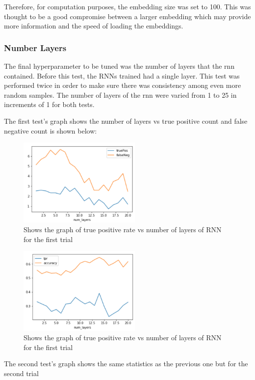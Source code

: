 \documentclass[twoside,twocolumn]{article}
\begin{document}
Therefore, for computation purposes, the embedding size was set to 100. This was thought to be
a good compromise between a larger embedding which may provide more information and the speed 
of loading the embeddings.

\subsubsection{Number Layers}

The final hyperparameter to be tuned was the number of layers that the rnn contained. Before this
test, the RNNs trained had a single layer. This test was performed twice in order to make sure there
 was consistency among even more random samples. The number of layers of the rnn were varied
 from 1 to 25 in increments of 1 for both tests.

 The first test's graph shows the number of layers vs true positive count and false negative count is shown below:

\begin{figure}[H]
\includegraphics[width=6cm]{rnn_numberLayers_test1}
\caption{Shows the graph of true positive rate vs number of layers of RNN for the first trial}
\centering
\end{figure}

\begin{figure}[H]
\includegraphics[width=6cm]{rnn_numberLayers_test1-tpr}
\caption{Shows the graph of true positive rate vs number of layers of RNN for the first trial}
\centering
\end{figure}

The second test's graph shows the same statistics as the previous one but for the second trial
\end{document}
